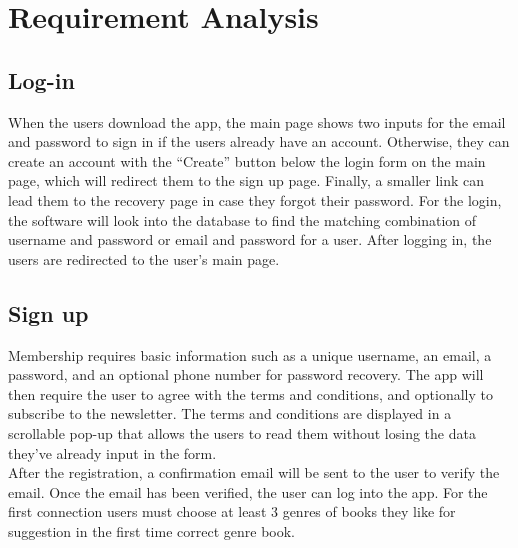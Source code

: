 \documentclass[conference]{IEEEtran}
\begin{document}
\section{Requirement Analysis}

\subsection{Log-in}
When the users download the app, the main page shows two inputs for the email and password to sign in if the users already have an account. Otherwise, they can create an account with the “Create” button below the login form on the main page, which will redirect them to the sign up page. Finally, a smaller link can lead them to the recovery page in case they forgot their password. For the login, the software will look into the database to find the matching combination of username and password or email and password for a user. After logging in, the users are redirected to the user's main page.\\

\subsection{Sign up}
Membership requires basic information such as a unique username, an email, a password, and an optional phone number for password recovery. The app will then require the user to agree with the terms and conditions, and optionally to subscribe to the newsletter. The terms and conditions are displayed in a scrollable pop-up that allows the users to read them without losing the data they've already input in the form.\\
After the registration, a confirmation email will be sent to the user to verify the email. Once the email has been verified, the user can log into the app. For the first connection users must choose at least 3 genres of books they like for suggestion in the first time correct genre book.\\
\end{document}
